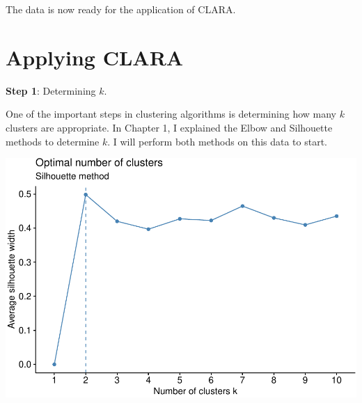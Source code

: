 \documentclass[12pt,twoside]{amherstthesis}
\begin{document}
  The data is now ready for the application of CLARA.
  
  \section{Applying CLARA}\label{applying-clara}
  
  \textbf{Step 1}: Determining \(k\).
  
  One of the important steps in clustering algorithms is determining how
  many \(k\) clusters are appropriate. In Chapter 1, I explained the Elbow
  and Silhouette methods to determine \(k\). I will perform both methods
  on this data to start.
  
  \begin{Shaded}
  \begin{Highlighting}[]
  \StringTok{ } \NormalTok{) }\OperatorTok{+}
  \StringTok{    }\NormalTok{(} \NormalTok{, } \NormalTok{)}\OperatorTok{+}
  \StringTok{  }\NormalTok{(} \NormalTok{)}
  
   \NormalTok{) }\OperatorTok{+}
  \StringTok{  }\NormalTok{(} \NormalTok{)}
  \end{Highlighting}
  \end{Shaded}
  
  \begin{center}\includegraphics{Comps_Proj_files/figure-latex/unnamed-chunk-5-1} \end{center}
  
\end{document}
